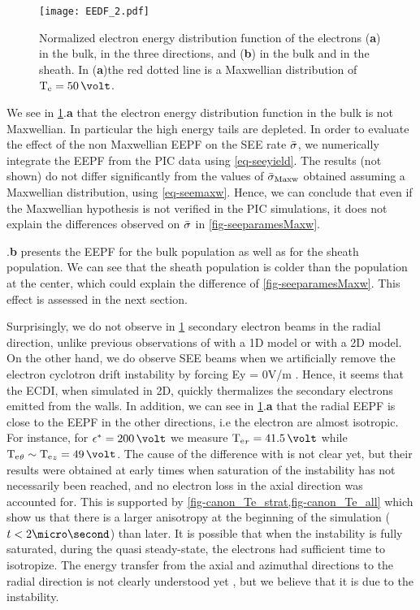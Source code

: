      \begin{figure}[hbt]
       \centering
       \texttt{[image: EEDF\_2.pdf]}
       \caption{Normalized electron energy distribution function of the electrons ({\bf a}) in the bulk, in the three directions, and ({\bf b}) in the bulk and in the sheath. In ({\bf a})the red dotted line is  a Maxwellian distribution of $\Te=50\,\volt$. }
       \label{fig-EEDF}
     \end{figure}
     
    We see in \cref{fig-EEDF}.{\bf a} that the electron energy distribution function in the bulk is not Maxwellian.
    In particular the high energy tails are depleted.
    In order to evaluate the effect of the non Maxwellian EEPF on the \ac{SEE} rate $ \bar{\sigma }$, we numerically integrate the EEPF from the PIC data using \cref{eq-seeyield}.
    The results (not shown) do not differ significantly from the values of $ \bar{\sigma }_{\rm Maxw}$ obtained assuming a Maxwellian distribution, using \cref{eq-seemaxw}.
    Hence, we can conclude that even if the Maxwellian hypothesis is not verified in the PIC simulations, it does not explain  the differences observed on $ \bar{\sigma }$ in \cref{fig-seeparamesMaxw}.


    .{\bf b} presents the EEPF for the bulk population as well as for the sheath population.
    We can see that the sheath population is colder than the population at the center, which could explain the difference of \cref{fig-seeparamesMaxw}. 
    This effect is assessed in the next section.

     Surprisingly, we do not observe in \cref{fig-EEDF} secondary electron beams in the radial  direction, unlike previous observations of \citet{sydorenko2006} with a 1D model or \citet{heron2013} with a 2D model.
     On the other hand, we do observe SEE beams when  we artificially remove the electron cyclotron drift instability by forcing Ey = 0V/m \citep{croes2017}.
     Hence, it seems that the ECDI, when simulated in 2D, quickly thermalizes the secondary electrons emitted from the walls.
     In addition, we can see in \cref{fig-EEDF}.{\bf a} that the radial EEPF is close to the EEPF in the other directions, i.e the electron are almost isotropic.
     For instance, for $\crover = 200\,\volt$  we measure $\Te_r = 41.5\,\volt$ while $\Te_{\theta} \sim \Te_z = 49\,\volt$.
     The cause of the difference with \citet{heron2013} is not clear yet, but their results were  obtained at early times when saturation of the instability has not necessarily been reached, and no electron loss in  the axial direction was accounted for.
     This is supported by \cref{fig-canon_Te_strat,fig-canon_Te_all} which show us that there is a larger anisotropy at the beginning of the simulation ($t<2\micro\second$) than later.
     It is possible that when the instability is fully saturated, during the quasi steady-state, the electrons had sufficient time to isotropize.
     The energy transfer from the axial and azimuthal directions to the radial direction is not clearly understood
     yet \citep{janhunen2018}, but we believe that it is due to the instability.



